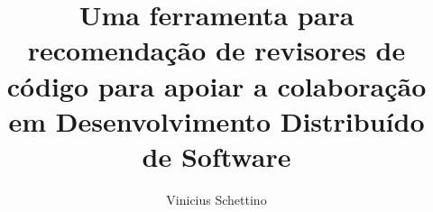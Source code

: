 \documentclass[preprint,12pt]{elsarticle}
\title{Uma ferramenta para recomendação de revisores de código para apoiar a colaboração em Desenvolvimento Distribuído de Software}
\author{Vinicius Schettino}
\begin{document}
\begin{frontmatter}

















\end{frontmatter}
\end{document}
